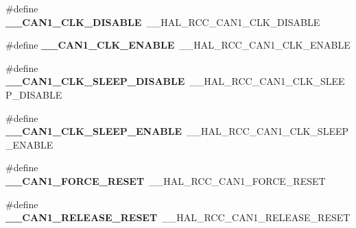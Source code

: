 \begin{DoxyCompactItemize}
\item 
\hypertarget{group___h_a_l___r_c_c___aliased_ga069d17c79a340a1635b26ddd76b677f0}{\#define {\bfseries \-\_\-\-\_\-\-C\-A\-N1\-\_\-\-C\-L\-K\-\_\-\-D\-I\-S\-A\-B\-L\-E}~\-\_\-\-\_\-\-H\-A\-L\-\_\-\-R\-C\-C\-\_\-\-C\-A\-N1\-\_\-\-C\-L\-K\-\_\-\-D\-I\-S\-A\-B\-L\-E}\label{group___h_a_l___r_c_c___aliased_ga069d17c79a340a1635b26ddd76b677f0}

\item 
\hypertarget{group___h_a_l___r_c_c___aliased_ga87260dd9425f0d8224e8422f73288e20}{\#define {\bfseries \-\_\-\-\_\-\-C\-A\-N1\-\_\-\-C\-L\-K\-\_\-\-E\-N\-A\-B\-L\-E}~\-\_\-\-\_\-\-H\-A\-L\-\_\-\-R\-C\-C\-\_\-\-C\-A\-N1\-\_\-\-C\-L\-K\-\_\-\-E\-N\-A\-B\-L\-E}\label{group___h_a_l___r_c_c___aliased_ga87260dd9425f0d8224e8422f73288e20}

\item 
\hypertarget{group___h_a_l___r_c_c___aliased_gaf7ed90e300d365c10dbc7edf38d71cd9}{\#define {\bfseries \-\_\-\-\_\-\-C\-A\-N1\-\_\-\-C\-L\-K\-\_\-\-S\-L\-E\-E\-P\-\_\-\-D\-I\-S\-A\-B\-L\-E}~\-\_\-\-\_\-\-H\-A\-L\-\_\-\-R\-C\-C\-\_\-\-C\-A\-N1\-\_\-\-C\-L\-K\-\_\-\-S\-L\-E\-E\-P\-\_\-\-D\-I\-S\-A\-B\-L\-E}\label{group___h_a_l___r_c_c___aliased_gaf7ed90e300d365c10dbc7edf38d71cd9}

\item 
\hypertarget{group___h_a_l___r_c_c___aliased_ga5c4f52b3a404de36c14b7e004c764f7d}{\#define {\bfseries \-\_\-\-\_\-\-C\-A\-N1\-\_\-\-C\-L\-K\-\_\-\-S\-L\-E\-E\-P\-\_\-\-E\-N\-A\-B\-L\-E}~\-\_\-\-\_\-\-H\-A\-L\-\_\-\-R\-C\-C\-\_\-\-C\-A\-N1\-\_\-\-C\-L\-K\-\_\-\-S\-L\-E\-E\-P\-\_\-\-E\-N\-A\-B\-L\-E}\label{group___h_a_l___r_c_c___aliased_ga5c4f52b3a404de36c14b7e004c764f7d}

\item 
\hypertarget{group___h_a_l___r_c_c___aliased_gaa24eae8792489be2147d968eba01d7d9}{\#define {\bfseries \-\_\-\-\_\-\-C\-A\-N1\-\_\-\-F\-O\-R\-C\-E\-\_\-\-R\-E\-S\-E\-T}~\-\_\-\-\_\-\-H\-A\-L\-\_\-\-R\-C\-C\-\_\-\-C\-A\-N1\-\_\-\-F\-O\-R\-C\-E\-\_\-\-R\-E\-S\-E\-T}\label{group___h_a_l___r_c_c___aliased_gaa24eae8792489be2147d968eba01d7d9}

\item 
\hypertarget{group___h_a_l___r_c_c___aliased_ga0e51838a3ca9bd8f2c04ed1acd78c6a0}{\#define {\bfseries \-\_\-\-\_\-\-C\-A\-N1\-\_\-\-R\-E\-L\-E\-A\-S\-E\-\_\-\-R\-E\-S\-E\-T}~\-\_\-\-\_\-\-H\-A\-L\-\_\-\-R\-C\-C\-\_\-\-C\-A\-N1\-\_\-\-R\-E\-L\-E\-A\-S\-E\-\_\-\-R\-E\-S\-E\-T}\label{group___h_a_l___r_c_c___aliased_ga0e51838a3ca9bd8f2c04ed1acd78c6a0}


\end{DoxyCompactItemize}
